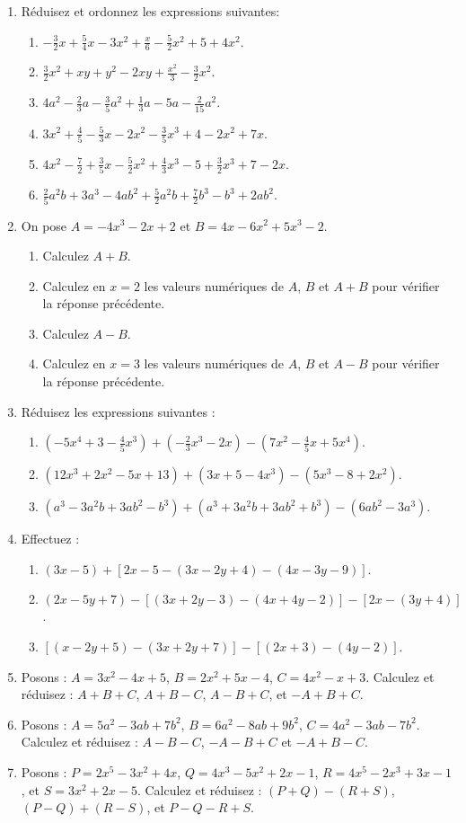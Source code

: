 \documentclass[12 pt]{extarticle}
\theoremstyle{plain}
\begin{document}
\begin{enumerate}
\item Réduisez et ordonnez les expressions suivantes: 
\begin{enumerate}
\item $-\frac32 x + \frac54 x-3x^2+\frac{x}6-\frac52 x^2+5+4x^2$.
\item $\frac32 x^2+xy+y^2-2xy+\frac{x^2}3-\frac32x^2$.
\item $4a^2-\frac23a-\frac35a^2+\frac13a-5a-\frac2{15}a^2$.
\item $3x^2+\frac45 - \frac53x - 2x^2 -\frac35x^3 + 4 - 2 x^2 + 7x$. 
\item $4x^2 - \frac72 + \frac35x - \frac52x^2 + \frac43 x^3 - 5 + \frac32 x^3 + 7 - 2x$. 
\item $\frac25 a^2b + 3a^3 -4ab^2 + \frac52 a^2b + \frac72b^3 - b^3 + 2ab^2$. 
\end{enumerate}
\item On pose $A= -4x^3 - 2x+2$ et $B= 4x-6x^2 + 5x^3 - 2$. \begin{enumerate}
\item Calculez $A+B$. 
\item Calculez en $x=2$ les valeurs numériques de $A$, $B$ et $A+B$ pour vérifier la réponse précédente. 
\item Calculez $A-B$.
\item Calculez en $x=3$ les valeurs numériques de $A$, $B$ et $A-B$ pour vérifier la réponse précédente. 
\end{enumerate}
\item Réduisez les expressions suivantes : 
\begin{enumerate}
\item$ \left(-5 x^4 + 3 - \frac45 x^3\right) + \left( 
-\frac23 x^3 - 2x\right) - \left( 7x^2 - \frac45 x + 5x^4\right)$.
\item $(12x^3+2x^2-5x+13) + (3x+5-4x^3)- (5x^3-8+2x^2)$.
\item $(a^3-3a^2b+3ab^2-b^3) + (a^3+3a^2b+3ab^2+b^3) - (6ab^2-3a^3)$. 
\end{enumerate}
\item Effectuez : \begin{enumerate}
\item $(3x-5)+[2x-5 - (3x-2y+4) - (4x-3y-9)]$.
\item $(2x-5y+7) - [(3x+2y-3)-(4x+4y-2)]-[2x-(3y+4)]$. 
\item $[(x-2y+5) - (3x+2y+7)]-[(2x+3)-(4y-2)]$. 
\end{enumerate}
\item Posons : $A=3x^2-4x+5$, $B=2x^2+5x-4$, $C= 4x^2-x+3$. 
Calculez et réduisez : $A+B+C$, $A+B-C$, $A-B+C$, et $-A+B+C$. 
\item Posons : $A=5a^2-3ab+7b^2$, $B=6a^2-8ab+9b^2$, $C= 4a^2-3ab-7b^2$. 
Calculez et réduisez : $A-B-C$, $-A-B+C$ et $-A+B-C$.
\item Posons : $P=2x^5-3x^2+4x$, $Q=4x^3 - 5x^2 +2x-1$, $R = 4x^5 - 2x^3 + 3x -1$, et $S= 3x^2+2x-5$. 
Calculez et réduisez : $(P+Q)-(R+S)$, $(P-Q)+(R-S)$, et $P-Q-R+S$. 
\end{enumerate}
\end{document}
